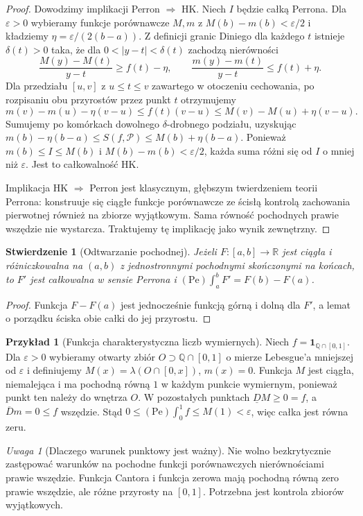 \documentclass[11pt,a4paper]{article}
\numberwithin{equation}{section}
\theoremstyle{plain}
\newtheorem{stwierdzenie}[twierdzenie]{Stwierdzenie}
\theoremstyle{definition}
\newtheorem{przyklad}[twierdzenie]{Przykład}
\theoremstyle{remark}
\newtheorem{uwaga}[twierdzenie]{Uwaga}
\newcommand{\R}{\mathbb R}
\newcommand{\Q}{\mathbb Q}
\newcommand{\ind}[1]{\mathbf 1_{#1}}
\newcommand{\Dn}{\underline D}
\newcommand{\Du}{\overline D}
\begin{document}
\begin{proof}
Dowodzimy implikacji Perron $\Rightarrow$ HK. Niech $I$ będzie całką Perrona. Dla $\varepsilon>0$ wybieramy funkcje porównawcze $M,m$ z $M(b)-m(b)<\varepsilon/2$ i kładziemy $\eta=\varepsilon/(2(b-a))$. Z definicji granic Diniego dla każdego $t$ istnieje $\delta(t)>0$ taka, że dla $0<|y-t|<\delta(t)$ zachodzą nierówności
\[
\frac{M(y)-M(t)}{y-t}\ge f(t)-\eta,\qquad
\frac{m(y)-m(t)}{y-t}\le f(t)+\eta.
\]
Dla przedziału $[u,v]$ z $u\le t\le v$ zawartego w otoczeniu cechowania, po rozpisaniu obu przyrostów przez punkt $t$ otrzymujemy
\[
m(v)-m(u)-\eta(v-u)\le f(t)(v-u)\le M(v)-M(u)+\eta(v-u).
\]
Sumujemy po komórkach dowolnego $\delta$-drobnego podziału, uzyskując $m(b)-\eta(b-a)\le S(f,\mathcal P)\le M(b)+\eta(b-a)$. Ponieważ $m(b)\le I\le M(b)$ i $M(b)-m(b)<\varepsilon/2$, każda suma różni się od $I$ o mniej niż $\varepsilon$. Jest to całkowalność HK.

Implikacja HK $\Rightarrow$ Perron jest klasycznym, głębszym twierdzeniem teorii Perrona: konstruuje się ciągłe funkcje porównawcze ze ścisłą kontrolą zachowania pierwotnej również na zbiorze wyjątkowym. Sama równość pochodnych prawie wszędzie nie wystarcza. Traktujemy tę implikację jako wynik zewnętrzny.
\end{proof}
\begin{stwierdzenie}[Odtwarzanie pochodnej]
Jeżeli $F:[a,b]\to\R$ jest ciągła i różniczkowalna na $(a,b)$ z jednostronnymi pochodnymi skończonymi na końcach, to $F'$ jest całkowalna w sensie Perrona i $(\mathrm{Pe})\int_a^b F'=F(b)-F(a)$.
\end{stwierdzenie}
\begin{proof}
Funkcja $F-F(a)$ jest jednocześnie funkcją górną i dolną dla $F'$, a lemat o porządku ściska obie całki do jej przyrostu.
\end{proof}
\begin{przyklad}[Funkcja charakterystyczna liczb wymiernych]
Niech $f=\ind{\Q\cap[0,1]}$. Dla $\varepsilon>0$ wybieramy otwarty zbiór $O\supset\Q\cap[0,1]$ o mierze Lebesgue'a mniejszej od $\varepsilon$ i definiujemy $M(x)=\lambda(O\cap[0,x])$, $m(x)=0$. Funkcja $M$ jest ciągła, niemalejąca i ma pochodną równą $1$ w każdym punkcie wymiernym, ponieważ punkt ten należy do wnętrza $O$. W pozostałych punktach $\Dn M\ge0=f$, a $\Du m=0\le f$ wszędzie. Stąd $0\le(\mathrm{Pe})\int_0^1f\le M(1)<\varepsilon$, więc całka jest równa zeru.
\end{przyklad}
\begin{uwaga}[Dlaczego warunek punktowy jest ważny]
Nie wolno bezkrytycznie zastępować warunków na pochodne funkcji porównawczych nierównościami prawie wszędzie. Funkcja Cantora i funkcja zerowa mają pochodną równą zero prawie wszędzie, ale różne przyrosty na $[0,1]$. Potrzebna jest kontrola zbiorów wyjątkowych.
\end{uwaga}
\end{document}
